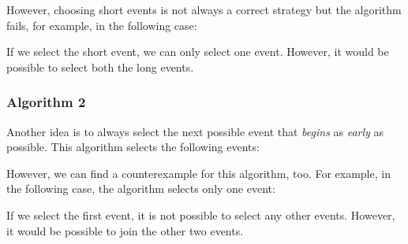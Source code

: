 However, choosing short events is not always
a correct strategy but the algorithm fails,
for example, in the following case:
\begin{center}
\end{center}
If we select the short event, we can only select one event.
However, it would be possible to select both the long events.

\subsubsection*{Algorithm 2}

Another idea is to always select the next possible
event that \emph{begins} as \emph{early} as possible.
This algorithm selects the following events:
\begin{center}
\end{center}

However, we can find a counterexample for this
algorithm, too.
For example, in the following case,
the algorithm selects only one event:
\begin{center}
\end{center}
If we select the first event, it is not possible
to select any other events.
However, it would be possible to join the
other two events.

